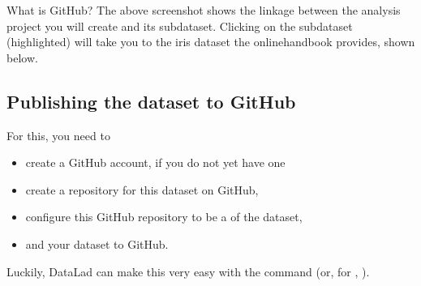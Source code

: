\begin{findoutmore}[label={fom-github}, before title={\thetcbcounter\ }, float, floatplacement=p, check odd page=true]{What is GitHub?}
\sphinxAtStartPar
The above screenshot shows the linkage between the analysis project you will create
and its subdataset. Clicking on the subdataset (highlighted) will take you to the iris dataset
the online\sphinxhyphen{}handbook provides, shown below.

\vspace{1mm}
\vspace{1mm}

\end{findoutmore}

\ignorespaces 

\subsection{Publishing the dataset to GitHub}
\label{\detokenize{basics/101-130-yodaproject:publishing-the-dataset-to-github}}\label{\detokenize{basics/101-130-yodaproject:publishtogithub}}\label{\detokenize{basics/101-130-yodaproject:index-11}}
\sphinxAtStartPar
For this, you need to
\begin{itemize}
\item {} 
\sphinxAtStartPar
create a GitHub account, if you do not yet have one

\item {} 
\sphinxAtStartPar
create a repository for this dataset on GitHub,

\item {} 
\sphinxAtStartPar
configure this GitHub repository to be a {\hyperref[\detokenize{glossary:term-sibling}]{}} of the  dataset,

\item {} 
\sphinxAtStartPar
and  your dataset to GitHub.

\end{itemize}

\ignorespaces 
\sphinxAtStartPar
Luckily, DataLad can make this very easy with the
command (or, for , ).


